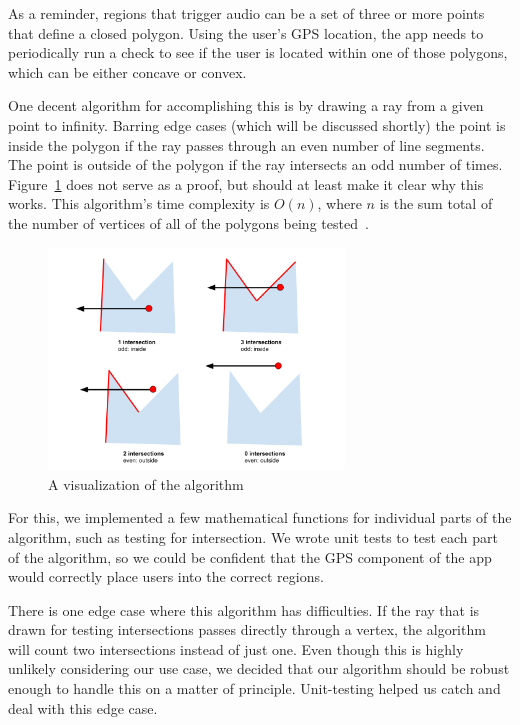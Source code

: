 \documentclass[a4paper, 10pt, american, titlepage]{article}
\begin{document}
As a reminder, regions that trigger audio can be a set of three or more points
that define a closed polygon. Using the user's GPS location, the app needs to
periodically run a check to see if the user is located within one of those
polygons, which can be either concave or convex.

One decent algorithm for accomplishing this is by drawing a ray from a given
point to infinity. Barring edge cases (which will be discussed shortly) the
point is inside the polygon if the ray passes through an even number of line
segments.  The point is outside of the polygon if the ray intersects an odd
number of times. Figure~\ref{fig:intersectionsDiagram} does not serve as a
proof, but should at least make it clear why this works. This algorithm's time
complexity is $O(n)$, where $n$ is the sum total of the number of vertices of
all of the polygons being tested~\autocite{geeksforgeekspolygon}.

\begin{figure}[h]
	\centering
	\includegraphics[width=0.7\textwidth]{intersections-diagram.png}
	\caption{A visualization of the algorithm}
	\label{fig:intersectionsDiagram}
\end{figure}

For this, we implemented a few mathematical functions for individual parts of
the algorithm, such as testing for intersection. We wrote unit tests to test
each part of the algorithm, so we could be confident that the GPS component of
the app would correctly place users into the correct regions.

There is one edge case where this algorithm has difficulties. If the ray that
is drawn for testing intersections passes directly through a vertex, the
algorithm will count two intersections instead of just one. Even though this is
highly unlikely considering our use case, we decided that our algorithm should
be robust enough to handle this on a matter of principle. Unit-testing helped us
catch and deal with this edge case.
\end{document}
